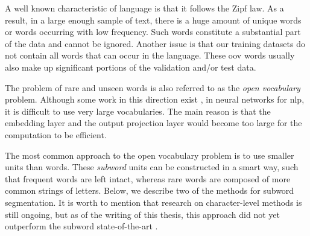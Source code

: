 A well known characteristic of language is that it follows the Zipf law. As a 
result, in a large enough sample of text, there is a huge amount of unique 
words or words occurring with low frequency. Such words constitute a 
substantial part of the data and cannot be ignored.
Another issue is that our training datasets do not contain all words that
can occur in the language. These \gls{oov} words usually also make up
significant portions of the validation and/or test data.

The problem of rare and unseen words is also referred to as the \emph{open 
vocabulary} problem. Although some work in this direction exist \citep{jean2015using}, in neural networks for \gls{nlp}, it is difficult to use very large vocabularies. The main reason is that the embedding layer and the output projection layer would become too large for the computation to be efficient.

The most common approach to the open vocabulary problem is to use smaller
units than words. These \emph{subword} units can be constructed in a smart
way, such that frequent words are left intact, whereas rare words are composed
of more common strings of letters. Below, we describe two of the methods
for subword segmentation. It is worth to mention that research on 
character-level methods is still ongoing, but as of the writing of this thesis,
this approach did not yet outperform the subword state-of-the-art 
\citep{chung-etal-2016-character,lee-etal-2017-fully,gao-etal-2020-character}.
%
%
%
%
%
%
%
%
%
%
%
%
%
%
%
%
%
%
%
%
%
%
%
%


